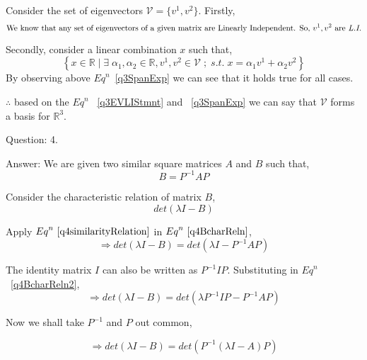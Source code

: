 \documentclass[a4paper]{article}
\begin{document}
\begin{qalist}
			Consider the set of eigenvectors $\mathcal{V} = \{{v}^{1}, {v}^{2}\}$. Firstly,
			\begin{equation} \label{q3EVLIStmnt}
				\text{We know that any set of eigenvectors of a given matrix are Linearly Independent. So, ${v}^{1}, {v}^{2}$ are \textit{L.I.}}
			\end{equation}
			
			Secondly, consider a linear combination $x$ such that, 
			\begin{equation}\label{q3SpanExp}
				\left\{x\in\mathbb{R}\;|\;\exists \; {\alpha}_{1}, {\alpha}_{2} \in \mathbb{R}, {v}^{1}, {v}^{2} \in \mathcal{V} \;;\;s.t.\;x = {\alpha}_{1}{v}^{1} + {\alpha}_{2}{v}^{2}\right\}
			\end{equation}
			By observing above ${Eq}^{n}$~\ref{q3SpanExp} we can see that it holds true for all cases.
			
			$\therefore$ based on the ${Eq}^{n}$ ~\ref{q3EVLIStmnt} and ~\ref{q3SpanExp} we can say that $\mathcal{V}$ forms a basis for ${\mathbb{R}}^{3}$.

		\item[Question: 4.] \setcounter{equation}{0} 
		\item[Answer:] We are given two similar square matrices $A$ and $B$ such that,
			\begin{equation}\label{q4similarityRelation}B = {P}^{-1} A P\end{equation}
			
			Consider the characteristic relation of matrix $B$, 
			\begin{equation}\label{q4BcharReln1} det(\lambda I - B) \end{equation}
			
			Apply ${Eq}^{n}~\ref{q4similarityRelation}$ in ${Eq}^{n}~\ref{q4BcharReln}$, 
			\begin{equation}\label{q4BcharReln2}
				\Rightarrow  det(\lambda I - B) =  det(\lambda I - {P}^{-1} A P) 
			\end{equation}
			
			The identity matrix $I$ can also be written as ${P}^{-1} I P$. Substituting in ${Eq}^{n}$ ~\ref{q4BcharReln2}, 
			\begin{equation}\label{q4BcharReln3}
				\Rightarrow  det(\lambda I - B) =  det(\lambda {P}^{-1} I P - {P}^{-1} A P) 
			\end{equation}
			
			Now we shall take ${P}^{-1}$ and $P$ out common, 
			
			\begin{equation}\label{q4BcharReln4}
				\Rightarrow  det(\lambda I - B) =  det({P}^{-1} (\lambda I - A) P) 
			\end{equation}
			

\end{qalist}
\end{document}
